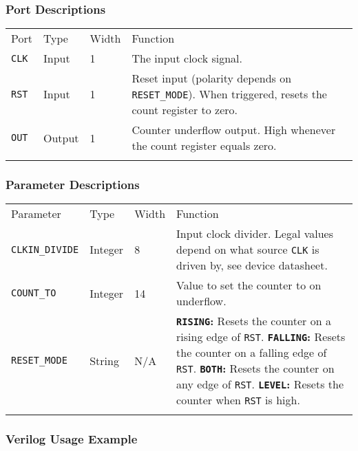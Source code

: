 \documentclass[11pt]{article}
\newcommand{\tokenstyle}[1]{\texttt{#1}}
\newcommand{\valuestyle}[1]{\texttt{#1}}
\newcommand{\strvaluestyle}[1]{\valuestyle{\textquotedbl#1\textquotedbl}}
\newcommand{\strexamplestyle}[1]{\textbf{\strvaluestyle{#1}:}}
\newcommand{\whenstyle}[1]{{\fontseries{sb}\selectfont#1}}
\newcommand{\thinhline}{\Xhline{1\arrayrulewidth}}
\newcommand{\thickhline}{\Xhline{2.5\arrayrulewidth}}
\begin{document}
\subsubsection{Port Descriptions}

\begin{tabularx}{\textwidth}{lllX}
\thinhline
\whenstyle{Port} & \whenstyle{Type} & \whenstyle{Width} & \whenstyle{Function} \\
\thickhline
\tokenstyle{CLK} & Input & 1 & The input clock signal. \\
\thinhline
\tokenstyle{RST} & Input & 1 & Reset input (polarity depends on \tokenstyle{RESET\_MODE}). When triggered, resets the count register to zero. \\
\thinhline
\tokenstyle{OUT} & Output & 1 & Counter underflow output. High whenever the count register equals zero. \\
\thinhline
\end{tabularx}

\subsubsection{Parameter Descriptions}

\begin{tabularx}{\textwidth}{lllX}
\thinhline
\whenstyle{Parameter} & \whenstyle{Type} & \whenstyle{Width} & \whenstyle{Function} \\
\thickhline
\tokenstyle{CLKIN\_DIVIDE} & Integer & 8 &
	Input clock divider. Legal values depend on what source \tokenstyle{CLK} is driven by, see device datasheet.\\
\thinhline
\tokenstyle{COUNT\_TO} & Integer & 14 & Value to set the counter to on underflow. \\
\thinhline
\tokenstyle{RESET\_MODE} & String & N/A &
	\strexamplestyle{RISING} Resets the counter on a rising edge of \tokenstyle{RST}. \newline
	\strexamplestyle{FALLING} Resets the counter on a falling edge of \tokenstyle{RST}. \newline
	\strexamplestyle{BOTH} Resets the counter on any edge of \tokenstyle{RST}. \newline
	\strexamplestyle{LEVEL} Resets the counter when \tokenstyle{RST} is high. \\
\thinhline
\end{tabularx}

\subsubsection{Verilog Usage Example}
\end{document}
